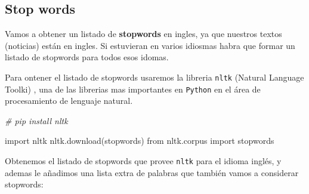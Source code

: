 \documentclass[
  11pt,
  a4paper,
]{article}
\newenvironment{Shaded}{\begin{snugshade}}{\end{snugshade}}
\newcommand{\CommentTok}[1]{\textcolor[rgb]{0.56,0.35,0.01}{\textit{#1}}}
\newcommand{\ImportTok}[1]{#1}
\newcommand{\NormalTok}[1]{#1}
\newcommand{\StringTok}[1]{\textcolor[rgb]{0.31,0.60,0.02}{#1}}
\begin{document}
\hypertarget{stop-words}{%
\subsection{Stop words}\label{stop-words}}

Vamos a obtener un listado de \textbf{stopwords} en ingles, ya que
nuestros textos (noticias) están en ingles. Si estuvieran en varios
idiosmas habra que formar un listado de stopwords para todos esos
idomas.

Para ontener el listado de stopwords usaremos la libreria \texttt{nltk}
(Natural Language Toolki) , una de las librerias mas importantes en
\texttt{Python} en el área de procesamiento de lenguaje natural.

\begin{Shaded}
\begin{Highlighting}[]
\CommentTok{\# pip install nltk}
\end{Highlighting}
\end{Shaded}

\begin{Shaded}
\begin{Highlighting}[]
\ImportTok{import}\NormalTok{ nltk}
\NormalTok{nltk.download(}\StringTok{\textquotesingle{}stopwords\textquotesingle{}}\NormalTok{)}
\ImportTok{from}\NormalTok{ nltk.corpus }\ImportTok{import}\NormalTok{ stopwords}
\end{Highlighting}
\end{Shaded}

Obtenemos el listado de stopwords que provee \texttt{nltk} para el
idioma inglés, y ademas le añadimos una lista extra de palabras que
también vamos a considerar stopwords:
\end{document}
